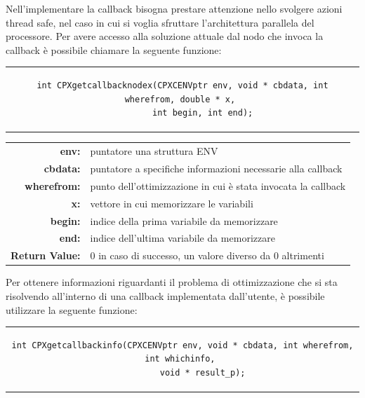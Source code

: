 Nell'implementare la callback bisogna prestare attenzione nello svolgere azioni thread safe, nel caso in cui si voglia sfruttare l'architettura parallela del processore.
Per avere accesso alla soluzione attuale dal nodo che invoca la callback è possibile chiamare la seguente funzione:
\begin{center}
\begin{tabular}{c}
\begin{lstlisting}[linewidth=410pt, basicstyle=\footnotesize\sffamily,]     
int CPXgetcallbacknodex(CPXCENVptr env, void * cbdata, int wherefrom, double * x, 
		int begin, int end);
\end{lstlisting}
\end{tabular}
\end{center}
\vspace{0.4 cm}
\begin{table}[h]
\centering
\begin{tabular}{rl}
\textbf{env:} & {puntatore una struttura ENV}\\
\textbf{cbdata:} & {puntatore a specifiche informazioni necessarie alla callback}\\
\textbf{wherefrom:} & {punto dell'ottimizzazione in cui è stata invocata la callback} \\ 
\textbf{x:} & {vettore in cui memorizzare le variabili} \\
\textbf{begin:} & {indice della prima variabile da memorizzare}\\
\textbf{end:} & {indice dell'ultima variabile da memorizzare}\\  
\textbf{Return Value:} & {0 in caso di successo, un valore diverso da 0 altrimenti}\\                               
\end{tabular}
\end{table}
Per ottenere informazioni riguardanti il problema di ottimizzazione che si sta risolvendo all'interno di una callback implementata dall'utente, è possibile utilizzare la seguente funzione:
\begin{center}
\begin{tabular}{c}
\begin{lstlisting}[linewidth=415pt, basicstyle=\footnotesize\sffamily,]  
int CPXgetcallbackinfo(CPXCENVptr env, void * cbdata, int wherefrom, int whichinfo, 
		void * result_p);
\end{lstlisting}
\end{tabular}
\end{center}
